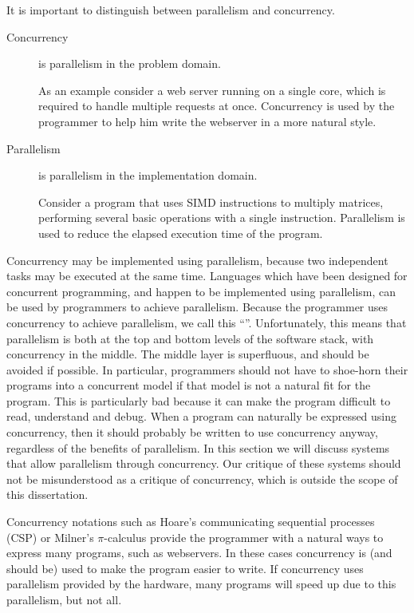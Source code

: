 It is important to distinguish between parallelism and concurrency.
\begin{description}
    \item[Concurrency] is parallelism in the problem domain.

    As an example consider a web server running on a single core,
    which is required to handle multiple requests at once.
    Concurrency is used by the programmer to help him write the webserver in
    a more natural style.

    \item[Parallelism] is parallelism in the implementation domain.
   
    Consider a program that uses SIMD instructions to multiply matrices,
    performing several basic operations with a single instruction.
    Parallelism is used to reduce the elapsed execution time of the program. 

\end{description}

Concurrency may be implemented using parallelism,
because two independent tasks may be executed at the same time.
Languages which have been designed for concurrent programming,
and happen to be implemented using parallelism,
can be used by programmers to achieve parallelism.
Because the programmer uses concurrency to achieve parallelism,
we call this ``\pvc''.
Unfortunately,
this means that parallelism is both at the top and bottom levels of the
software stack, with concurrency in the middle.
The middle layer is superfluous, and should be avoided if possible.
In particular,
programmers should not have to shoe-horn their programs into a concurrent
model if that model is not a natural fit for the program.
This is particularly bad because it can make the program difficult to read,
understand and debug.
When a program can naturally be expressed using concurrency,
then it should probably be written to use concurrency anyway,
regardless of the benefits of parallelism.
In this section we will discuss systems that allow parallelism through
concurrency.
Our critique of these systems should not be misunderstood as a critique of
concurrency,
which is outside the scope of this dissertation.

Concurrency notations such as Hoare's
communicating sequential processes (CSP) \citep{hoare:1978:CSP}
or Milner's $\pi$-calculus \citep{milner:pi}
provide the programmer with a natural ways to express many programs,
such as webservers.
In these cases concurrency is (and should be) used to make the program
easier to write.
If concurrency uses parallelism provided by the hardware,
many programs will speed up due to this parallelism, but not all.

